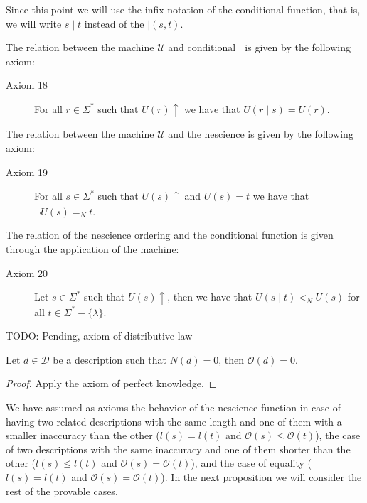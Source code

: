 Since this point we will use the infix notation of the conditional function, that is, we will write $s \mid t$ instead of the $\mid (s, t)$.

The relation between the machine $\mathcal{U}$ and conditional $\mid$ is given by the following axiom:

\vskip 0.25cm

\begin{description}
\item[Axiom 18] For all $r \in \Sigma^\ast$ such that $U(r) \uparrow$ we have that $U(r \mid s) = U(r)$.
\end{description}

\vskip 0.25cm

The relation between the machine $\mathcal{U}$ and the nescience is given by the following axiom:

\begin{description}
\item[Axiom 19] For all $s \in \Sigma^\ast$ such that $U(s) \uparrow$ and $U(s) = t$ we have that $\lnot U(s) =_N t$.
\end{description}

\vskip 0.25cm

The relation of the nescience ordering and the conditional function is given through the application of the machine:

\begin{description}
\item[Axiom 20] Let $s \in \Sigma^\ast$ such that $U(s) \uparrow$, then we have that $U(s \mid t) <_N U(s)$ for all $t \in \Sigma^\ast-\{\lambda\}$.
\end{description}

{\color{red} TODO: Pending, axiom of distributive law}

\begin{proposition}
Let $d \in \mathcal{D}$ be a description such that $N(d)=0$, then $\mathcal{O}(d)=0$.
\end{proposition}
\begin{proof}
Apply the axiom of perfect knowledge.
\end{proof}

We have assumed as axioms the behavior of the nescience function in case of having two related descriptions with the same length and one of them with a smaller inaccuracy than the other ($l(s) = l(t)$ and $\mathcal{O} (s) \leq \mathcal{O} (t)$), the case of two descriptions with the same inaccuracy and one of them shorter than the other ($l(s) \leq l(t)$ and $\mathcal{O} (s) = \mathcal{O} (t)$), and the case of equality ($l(s) = l(t)$ and $\mathcal{O} (s) = \mathcal{O} (t)$). In the next proposition we will consider the rest of the provable cases.

